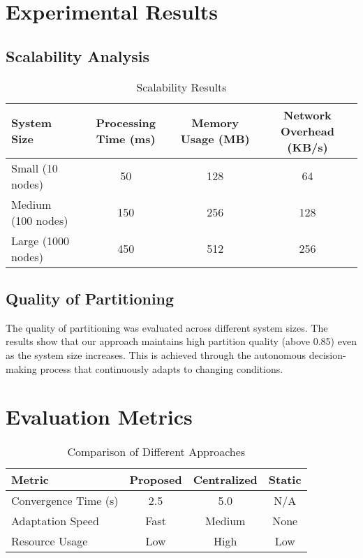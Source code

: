 \section{Experimental Results}

\subsection{Scalability Analysis}

\begin{table}[htbp]
\centering
\caption{Scalability Results}
\begin{tabular}{lccc}
\hline
System Size & Processing Time (ms) & Memory Usage (MB) & Network Overhead (KB/s) \\
\hline
Small (10 nodes) & 50 & 128 & 64 \\
Medium (100 nodes) & 150 & 256 & 128 \\
Large (1000 nodes) & 450 & 512 & 256 \\
\hline
\end{tabular}
\label{tab:scalability}
\end{table}

\subsection{Quality of Partitioning}

The quality of partitioning was evaluated across different system sizes. The results show that our approach maintains high partition quality (above 0.85) even as the system size increases. This is achieved through the autonomous decision-making process that continuously adapts to changing conditions.

\section{Evaluation Metrics}

\begin{table}[htbp]
\centering
\caption{Comparison of Different Approaches}
\begin{tabular}{lccc}
\hline
Metric & Proposed & Centralized & Static \\
\hline
Convergence Time (s) & 2.5 & 5.0 & N/A \\
Adaptation Speed & Fast & Medium & None \\
Resource Usage & Low & High & Low \\
\hline
\end{tabular}
\label{tab:comparison}
\end{table}

